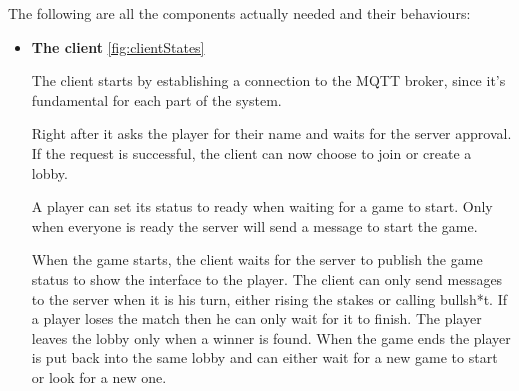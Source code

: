 \documentclass{scrartcl}
\begin{document}
The following are all the components actually needed and their behaviours:
\begin{itemize}
      \item
            \textbf{The client} \cref{fig:clientStates} \par
            The client starts by establishing a connection to the MQTT broker, since it's fundamental
            for each part of the system.

            Right after it asks the player for their name and waits for the server approval.
            If the request is successful, the client can now choose to join or create a lobby.

            A player can set its status to ready when waiting for a game to start. Only when everyone
            is ready the server will send a message to start the game.

            When the game starts, the client waits for the server to publish the game status to
            show the interface to the player.
            The client can only send messages to the server when it is his turn, either rising the
            stakes or calling bullsh*t. If a player loses the match then he can only wait for it to
            finish. The player leaves the lobby only when a winner is found. When the game ends the
            player is put back into the same lobby and can either wait for a new game to start or look
            for a new one.


\end{itemize}
\end{document}
